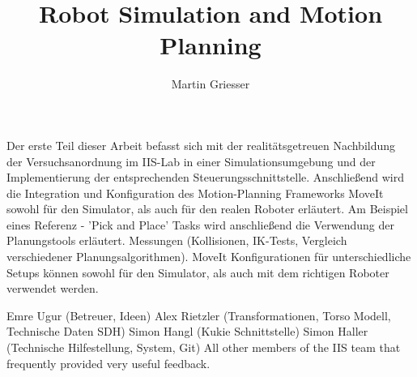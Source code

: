 \documentclass[bachelor]{iisthesis}
\title{Robot Simulation and Motion Planning}
\author{Martin Griesser}
\begin{document}
\maketitle

Der erste Teil dieser Arbeit befasst sich mit der realitätsgetreuen Nachbildung der Versuchsanordnung im IIS-Lab in einer Simulationsumgebung und der Implementierung der entsprechenden Steuerungsschnittstelle. Anschließend wird die Integration und Konfiguration des Motion-Planning Frameworks MoveIt sowohl für den Simulator, als auch für den realen Roboter erläutert. Am Beispiel eines Referenz - 'Pick and Place' Tasks wird anschließend die Verwendung der Planungstools erläutert.
Messungen (Kollisionen, IK-Tests, Vergleich verschiedener Planungsalgorithmen).
MoveIt Konfigurationen für unterschiedliche Setups können sowohl für den Simulator, als auch mit dem richtigen Roboter verwendet werden.

Emre Ugur (Betreuer, Ideen)
Alex Rietzler (Transformationen, Torso Modell, Technische Daten SDH)
Simon Hangl (Kukie Schnittstelle)
Simon Haller (Technische Hilfestellung, System, Git)
All other members of the IIS team that frequently provided very useful feedback.

\tableofcontents
\listoffigures
\listoftables

\uibkdeclaration
\label{chap:declare}








\appendix%

\end{document}
